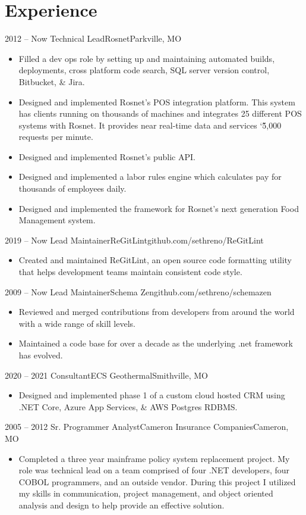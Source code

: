 \documentclass[11pt,letterpaper,final]{moderncv}
\begin{document}
\section{Experience} 
	\cventry
{2012 -- Now} {Technical Lead}{Rosnet}{Parkville, MO}{}{
		\begin{itemize}
			\item
				Filled a dev ops role by setting up and maintaining
				automated builds, deployments, cross platform code
				search, SQL server version control, Bitbucket, \& Jira.
			\item
				Designed and implemented Rosnet's POS integration
				platform. This system has clients running on thousands of
				machines and integrates 25 different POS systems with
				Rosnet. It provides near real-time data and services
				\char`\~5,000 requests per minute.
			\item
				Designed and implemented Rosnet's public API.
			\item
				Designed and implemented a labor rules engine which
				calculates pay for thousands of employees daily.
			\item
				Designed and implemented the framework for Rosnet's next
				generation Food Management system.
		\end{itemize}
}
	\cventry
{2019 -- Now} {Lead Maintainer}{ReGitLint}{github.com/sethreno/ReGitLint}{}{
		\begin{itemize}
			\item 
				Created and maintained ReGitLint, an open source code formatting
				utility that helps development teams maintain consistent code
				style.
		\end{itemize}
}
	\cventry
{2009 -- Now} {Lead Maintainer}{Schema Zen}{github.com/sethreno/schemazen}{}{
		\begin{itemize}
			\item 
				Reviewed and merged contributions from developers from around the world
				with a wide range of skill levels.
			\item 
				Maintained a code base for over a decade as the underlying .net
				framework has evolved.
		\end{itemize}
}
	\cventry
{2020 -- 2021} {Consultant}{ECS Geothermal}{Smithville, MO}{}{
		\begin{itemize}
			\item 
				Designed and implemented phase 1 of a custom cloud hosted CRM
				using .NET Core, Azure App Services, \& AWS Postgres RDBMS.
		\end{itemize}
}
	\cventry
{2005 -- 2012} {Sr. Programmer Analyst}{Cameron Insurance Companies}{Cameron, MO}{}{
		\begin{itemize}
			\item 
				Completed a three year mainframe policy system
				replacement project. My role was technical lead on a
				team comprised of four .NET developers, four COBOL
				programmers, and an outside vendor. During this project
				I utilized my skills in communication, project
				management, and object oriented analysis and design to
				help provide an effective solution.
		\end{itemize}
}
\end{document}
